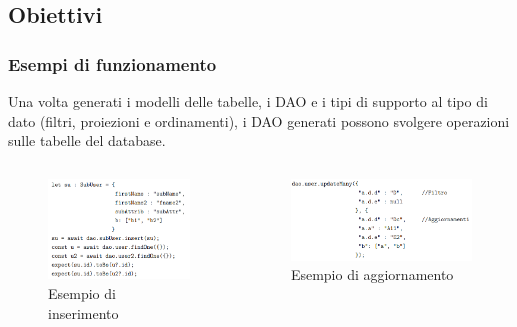 \documentclass[c]{beamer}
\begin{document}
        \subsection{Obiettivi}
            \begin{frame}
                \frametitle{Esempi di funzionamento}
                Una volta generati i modelli delle tabelle, i DAO e i tipi di supporto al tipo di dato (filtri, proiezioni e ordinamenti), i DAO generati possono svolgere
                operazioni sulle tabelle del database.
                \begin{columns}[T]
                        \begin{figure}
                            \includegraphics[scale=0.4]{Example_Insert.png}
                            \caption{Esempio di inserimento}
                        \end{figure}
                        \begin{figure}
                            \includegraphics[scale=0.4]{Example_Update.png}
                            \caption{Esempio di aggiornamento}
                        \end{figure}
                \end{columns}
            \end{frame}
\end{document}
